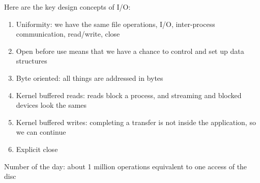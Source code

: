 \documentclass[paper=a4, fontsize=11pt]{scrartcl} %
\numberwithin{equation}{section} %
\numberwithin{figure}{section} %
\numberwithin{table}{section} %
\begin{document}
Here are the key design concepts of I/O: 
\begin{enumerate}
	\item Uniformity: we have the same file operations, I/O, inter-process communication, read/write, close
    \item Open before use means that we have a chance to control and set up data structures
    \item Byte oriented: all things are addressed in bytes
    \item Kernel buffered reads: reads block a process, and streaming and blocked devices look the sames
    \item Kernel buffered writes: completing a transfer is not inside the application, so we can continue
    \item Explicit close
\end{enumerate}
Number of the day: about 1 million operations equivalent to one access of the disc
\end{document}
